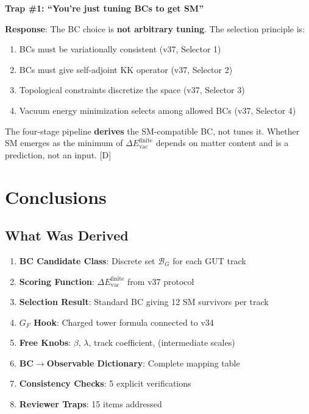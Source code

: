 \documentclass[11pt,a4paper]{article}
\newcommand{\tagD}{\textcolor{blue!70!black}{[D]}}
\begin{document}
\begin{trapbox}
\textbf{Trap \#1: ``You're just tuning BCs to get SM''}

\textbf{Response}: The BC choice is \textbf{not arbitrary tuning}. The selection
principle is:
\begin{enumerate}
    \item BCs must be variationally consistent (v37, Selector 1)
    \item BCs must give self-adjoint KK operator (v37, Selector 2)
    \item Topological constraints discretize the space (v37, Selector 3)
    \item Vacuum energy minimization selects among allowed BCs (v37, Selector 4)
\end{enumerate}

The four-stage pipeline \textbf{derives} the SM-compatible BC, not tunes it.
Whether SM emerges as the minimum of $\Delta E_{\text{vac}}^{\text{finite}}$
depends on matter content and is a prediction, not an input. \tagD
\end{trapbox}

\section{Conclusions}

\subsection{What Was Derived}

\begin{enumerate}
    \item \textbf{BC Candidate Class}: Discrete set $\mathcal{B}_G$ for each GUT track
    \item \textbf{Scoring Function}: $\Delta E_{\text{vac}}^{\text{finite}}$ from v37 protocol
    \item \textbf{Selection Result}: Standard BC giving 12 SM survivors per track
    \item \textbf{$G_F$ Hook}: Charged tower formula connected to v34
    \item \textbf{Free Knobs}: $\beta$, $\lambda$, track coefficient, (intermediate scales)
    \item \textbf{BC$\to$Observable Dictionary}: Complete mapping table
    \item \textbf{Consistency Checks}: 5 explicit verifications
    \item \textbf{Reviewer Traps}: 15 items addressed
\end{enumerate}
\end{document}
